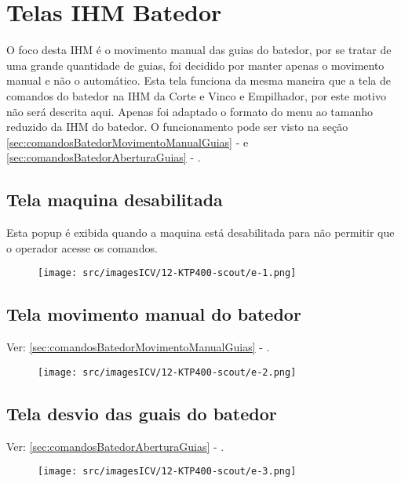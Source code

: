 \thispagestyle{fancy}
\vspace*{40 pt}
\section{\large{Telas IHM Batedor}}
O foco desta IHM é o movimento manual das guias do batedor, por se tratar de uma grande quantidade de guias, foi decidido por manter apenas o movimento manual e não o automático.
Esta tela funciona da mesma maneira que a tela de comandos do batedor na IHM da Corte e Vinco e Empilhador, por este motivo não será descrita aqui. 
Apenas foi adaptado o formato do menu ao tamanho reduzido da IHM do batedor. O funcionamento pode ser visto na seção \ref{sec:comandosBatedorMovimentoManualGuias} - 
e \ref{sec:comandosBatedorAberturaGuias} - .

\subsection{Tela maquina desabilitada}
    Esta popup é exibida quando a maquina está desabilitada para não permitir que o operador acesse os comandos.
\vspace*{\fill}
\begin{figure}[h]
  \centering
  \texttt{[image: src/imagesICV/12-KTP400-scout/e-1.png]}
\end{figure}
\vspace*{\fill}

\newpage
\thispagestyle{fancy}
\vspace*{40 pt}
\subsection{Tela movimento manual do batedor}
    Ver: \ref{sec:comandosBatedorMovimentoManualGuias} - .
\vspace*{\fill}
\begin{figure}[h]
  \centering
  \texttt{[image: src/imagesICV/12-KTP400-scout/e-2.png]}
\end{figure}
\vspace*{\fill}

\newpage
\thispagestyle{fancy}
\vspace*{40 pt}
\subsection{Tela desvio das guais do batedor}
    Ver: \ref{sec:comandosBatedorAberturaGuias} - .
\vspace*{\fill}
\begin{figure}[h]
  \centering
  \texttt{[image: src/imagesICV/12-KTP400-scout/e-3.png]}
\end{figure}
\vspace*{\fill}



